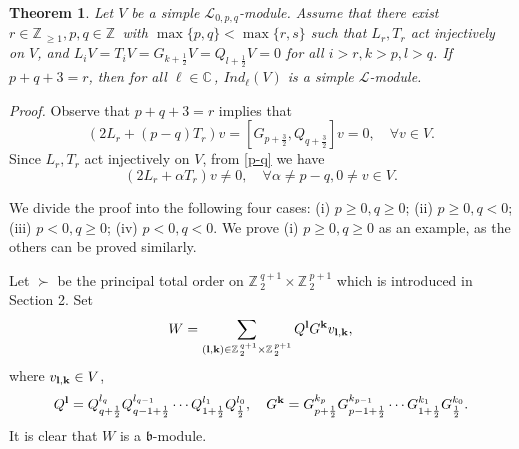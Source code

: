 \documentclass[12pt]{article}
\def\a{\alpha}
\def\ssc{\scriptscriptstyle}
\def\Z{\mathbb{Z}{\ssc\,}}
\def\C{\mathbb{C}{\ssc\,}}
\numberwithin{equation}{section}
\newtheorem{theo}{Theorem}[section]
\begin{document}
\begin{theo} \label{LT-th}Let $V$ be a simple $\mathcal{L}_{0,p,q}$-module. Assume that there exist $r\in\Z_{\ge 1}, p,q\in\Z$ with $\max\{p,q\}<\max\{r,s\}$ such that $L_r,T_r$ act injectively on $V$, and  $L_iV=T_iV=G_{k+\frac{1}{2}}V=Q_{l+\frac{1}{2}}V=0$ for all $i>r,k>p,l>q$.
If  $p+q+3=r$, then for all $\ell\in\C$, $Ind_\ell(V)$ is a simple $\mathcal{L}$-module.
\end{theo}

{\it Proof.}  Observe that  $p+q+3=r$ implies that
\begin{equation}\label{p-q}
(2L_r+(p-q)T_r)v=[G_{p+\frac{3}{2}},Q_{q+\frac{3}{2}}]v=0,\quad  \forall v\in V.
\end{equation}
Since $L_r,T_r$ act injectively on $V$, from \eqref{p-q} we have
\begin{equation}\label{=s}
(2L_r+\a T_r)v\ne 0,\quad  \forall \a\ne p-q, 0\ne  v\in V.
\end{equation}

We divide the proof  into the following four cases: (i) $p\ge 0,q\ge 0$; (ii) $p\ge 0,q< 0$; (iii) $p<0,q\ge 0$; (iv) $p<0,q<0$. We prove  (i) $p\ge 0,q\ge 0$ as an example, as the others can be proved similarly.

 Let $\succ$ be the principal  total order on $\Z_2^{q+1}\times \Z_2^{p+1}$ which is introduced in Section 2. Set
 $$W=\sum\limits_{({\bf l,k})\in \Z_2^{q+1}\times \Z_2^{p+1}}Q^{\bf l}G^{\bf k}v_{\bf l,k},$$
 where $v_{{\bf l,k}}\in V$, $$Q^{{\bf l}}=Q_{q+\frac{1}{2}}^{l_{q}}Q_{q-1+\frac{1}{2}}^{l_{q-1}}\cdots Q_{1+\frac{1}{2}}^{l_{1}} Q_{\frac{1}{2}}^{l_{0}}, \quad
 G^{{\bf k}}=G_{p+\frac{1}{2}}^{k_{p}}G_{p-1+\frac{1}{2}}^{k_{p-1}}\cdots G_{1+\frac{1}{2}}^{k_{1}} G_{\frac{1}{2}}^{k_{0}}.$$
It is clear that $W$ is a $\mathfrak{b}$-module.
\end{document}
